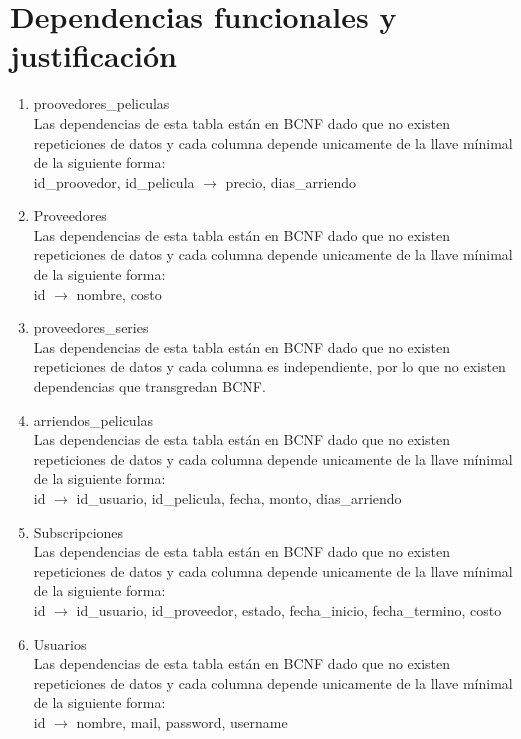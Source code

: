 \documentclass{article}
\begin{document}
\section{Dependencias funcionales y justificación}
\begin{enumerate}
    \item proovedores\_peliculas \\
    Las dependencias de esta tabla están en BCNF dado que no existen repeticiones de datos y cada columna depende unicamente de la llave mínimal de la siguiente forma: \\
    id\_proovedor, id\_pelicula $\rightarrow$ precio, dias\_arriendo
    \item Proveedores \\
    Las dependencias de esta tabla están en BCNF dado que no existen repeticiones de datos y cada columna depende unicamente de la llave mínimal de la siguiente forma: \\
    id $\rightarrow$ nombre, costo
    \item proveedores\_series \\
    Las dependencias de esta tabla están en BCNF dado que no existen repeticiones de datos y cada columna es independiente, por lo que no existen dependencias que transgredan BCNF. \\
    \item arriendos\_peliculas \\
    Las dependencias de esta tabla están en BCNF dado que no existen repeticiones de datos y cada columna depende unicamente de la llave mínimal de la siguiente forma: \\
    id $\rightarrow$ id\_usuario, id\_pelicula, fecha, monto, dias\_arriendo \\
    \item Subscripciones \\
    Las dependencias de esta tabla están en BCNF dado que no existen repeticiones de datos y cada columna depende unicamente de la llave mínimal de la siguiente forma: \\
    id $\rightarrow$ id\_usuario, id\_proveedor, estado, fecha\_inicio, fecha\_termino, costo \\
    \item Usuarios \\
    Las dependencias de esta tabla están en BCNF dado que no existen repeticiones de datos y cada columna depende unicamente de la llave mínimal de la siguiente forma: \\
    id $\rightarrow$ nombre, mail, password, username \\

\end{enumerate}
\end{document}
